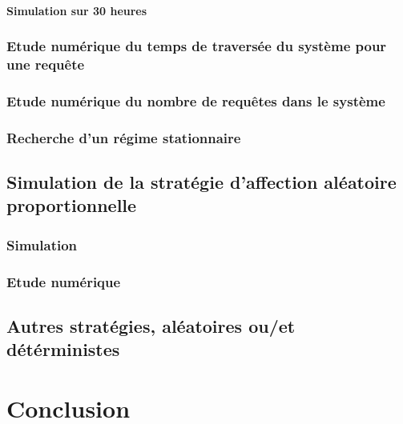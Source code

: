 \documentclass{article}
\begin{document}
\paragraph{Simulation sur 30 heures}

\subsubsection{Etude numérique du temps de traversée du système pour une requête}
\subsubsection{Etude numérique du nombre de requêtes dans le système}
\subsubsection{Recherche d'un régime stationnaire}

\subsection{Simulation de la stratégie d'affection aléatoire proportionnelle}
\subsubsection{Simulation}
\subsubsection{Etude numérique}

\subsection{Autres stratégies, aléatoires ou/et détérministes}

\section{Conclusion}
\paragraph{}

\newpage
\appendix

\section{}

\subsection{}
\begin{verbatim}
\end{verbatim}
\end{document}
